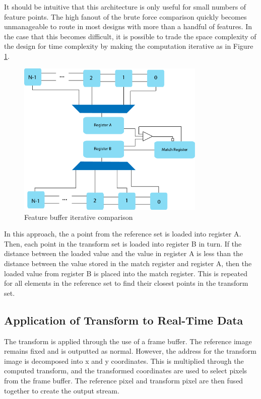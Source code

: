 \documentclass{article}
\begin{document}
It should be intuitive that this architecture is only useful for small numbers of feature points. The high fanout of the brute force comparison quickly becomes unmanageable to route in most designs with more than a handful of features. In the case that this becomes difficult, it is possible to trade the space complexity of the design for time complexity by making the computation iterative as in Figure \ref{fig_comparison_iter}.

\begin{figure}[h]
	\centering
	\includegraphics[width=0.8\textwidth]{figures/block/comparison_iter}
	\caption{Feature buffer iterative comparison}
	\label{fig_comparison_iter}
\end{figure}

In this approach, the a point from the reference set is loaded into register A. Then, each point in the transform set is loaded into register B in turn. If the distance between the loaded value and the value in register A is less than the distance between the value stored in the match register and register A, then the loaded value from register B is placed into the match register. This is repeated for all elements in the reference set to find their closest points in the transform set.

\subsection{Application of Transform to Real-Time Data}

The transform is applied through the use of a frame buffer. The reference image remains fixed and is outputted as normal. However, the address for the transform image is decomposed into x and y coordinates. This is multiplied through the computed transform, and the transformed coordinates are used to select pixels from the frame buffer. The reference pixel and transform pixel are then fused together to create the output stream.
\end{document}
